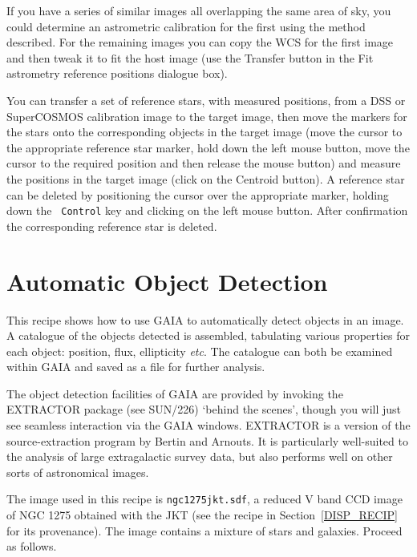 \documentclass[twoside,11pt]{article}
\newcommand{\xref}[3]{#1}
\newcommand{\xlabel}[1]{}
\begin{document}
If you have a series of similar images all overlapping the same area of
sky, you could determine an astrometric calibration for the first using the
method described.  For the remaining images you can copy the WCS for the
first image and then tweak it to fit the host image (use the {\sf Transfer}
button in the {\sf Fit astrometry reference positions} dialogue box).

You can transfer a set of reference stars, with measured positions, from
a DSS or SuperCOSMOS calibration image to the target image, then move
the markers for the stars onto the corresponding objects in the target
image (move the cursor to the appropriate reference star marker, hold down
the left mouse button, move the cursor to the required position and then
release the mouse button) and measure the positions in the target image
(click on the {\sf Centroid} button).  A reference star can be deleted by
positioning the cursor over the appropriate marker, holding down the {\tt
Control} key and clicking on the left mouse button.  After confirmation
the corresponding reference star is deleted.


\newpage
\section{\xlabel{OBJDET_RECIP}\label{OBJDET_RECIP}Automatic Object
Detection}

This recipe shows how to use GAIA to automatically detect objects in an
image.  A catalogue of the objects detected is assembled, tabulating
various properties for each object: position, flux, ellipticity \emph{etc}.
The catalogue can both be examined within GAIA and saved as a file for
further analysis.

The object detection facilities of GAIA are provided by invoking the
EXTRACTOR package (see \xref{SUN/226}{sun226}{}\cite{SUN226}) `behind the
scenes', though you will just see seamless interaction via the GAIA
windows.  EXTRACTOR is a version of the source-extraction program by
Bertin and Arnouts\cite{BERTIN96}.  It is particularly well-suited to the
analysis of large extragalactic survey data, but also performs well on
other sorts of astronomical images.

The image used in this recipe is {\tt ngc1275jkt.sdf}, a reduced V band
CCD image of NGC 1275 obtained with the JKT (see the recipe in
Section~\ref{DISP_RECIP} for its provenance).  The image contains a mixture
of stars and galaxies.  Proceed as follows.
\end{document}
